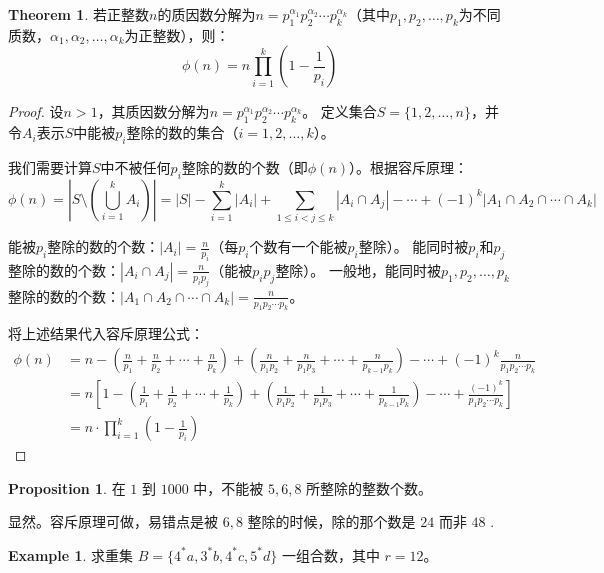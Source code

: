 \documentclass[oneside]{book}
\theoremstyle{definition}
\newtheorem{example}{Example}[section]
\newtheorem{proposition}{Proposition}[section]
\newtheorem{theorem}{Theorem}[section]
\begin{document}
	\begin{theorem}
		若正整数\(n\)的质因数分解为\(n = p_1^{\alpha_1} p_2^{\alpha_2} \cdots p_k^{\alpha_k}\)（其中\(p_1,p_2,\dots,p_k\)为不同质数，\(\alpha_1,\alpha_2,\dots,\alpha_k\)为正整数），则：
		\[
		\phi(n) = n \prod_{i=1}^{k} \left(1 - \frac{1}{p_i}\right)
		\]
	\end{theorem}
	
	\begin{proof}
		设\(n > 1\)，其质因数分解为\(n = p_1^{\alpha_1} p_2^{\alpha_2} \cdots p_k^{\alpha_k}\)。
		定义集合\(S = \{1,2,\dots,n\}\)，并令\(A_i\)表示\(S\)中能被\(p_i\)整除的数的集合（\(i = 1,2,\dots,k\)）。
		
		我们需要计算\(S\)中不被任何\(p_i\)整除的数的个数（即\(\phi(n)\)）。根据容斥原理：
		\[
		\phi(n) = \left| S \setminus \left( \bigcup_{i=1}^k A_i \right) \right| = |S| - \sum_{i=1}^k |A_i| + \sum_{1 \leq i<j \leq k} |A_i \cap A_j| - \cdots + (-1)^k |A_1 \cap A_2 \cap \cdots \cap A_k|
		\]
		
		能被\(p_i\)整除的数的个数：\(|A_i| = \frac{n}{p_i}\)（每\(p_i\)个数有一个能被\(p_i\)整除）。
		能同时被\(p_i\)和\(p_j\)整除的数的个数：\(|A_i \cap A_j| = \frac{n}{p_i p_j}\)（能被\(p_i p_j\)整除）。
		一般地，能同时被\(p_1,p_2,\dots,p_k\)整除的数的个数：\(|A_1 \cap A_2 \cap \cdots \cap A_k| = \frac{n}{p_1 p_2 \cdots p_k}\)。
		
		将上述结果代入容斥原理公式：
		\[
		\begin{aligned}
			\phi(n) &= n - \left( \frac{n}{p_1} + \frac{n}{p_2} + \cdots + \frac{n}{p_k} \right) + \left( \frac{n}{p_1 p_2} + \frac{n}{p_1 p_3} + \cdots + \frac{n}{p_{k-1} p_k} \right) - \cdots + (-1)^k \frac{n}{p_1 p_2 \cdots p_k} \\
			&= n \left[ 1 - \left( \frac{1}{p_1} + \frac{1}{p_2} + \cdots + \frac{1}{p_k} \right) + \left( \frac{1}{p_1 p_2} + \frac{1}{p_1 p_3} + \cdots + \frac{1}{p_{k-1} p_k} \right) - \cdots + \frac{(-1)^k}{p_1 p_2 \cdots p_k} \right] \\
			&= n \cdot \prod_{i=1}^{k} \left( 1 - \frac{1}{p_i} \right)
		\end{aligned}
		\]
	\end{proof}
	
	\begin{proposition}
		在 \( 1 \) 到 \( 1000 \) 中，不能被 \( 5,6,8 \) 所整除的整数个数。
	\end{proposition}
	显然。容斥原理可做，易错点是被 \( 6,8 \) 整除的时候，除的那个数是 \( 24 \) 而非 \( 48 \) .
	
	\begin{example}
		求重集 \( B=\{4^*a, 3^*b, 4^*c, 5^*d\} \) 一组合数，其中 \( r=12 \)。
	\end{example}
	
\end{document}
